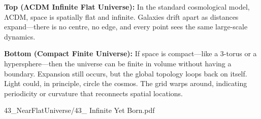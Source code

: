 \begin{SideNotePage}{
  \textbf{Top (ΛCDM Infinite Flat Universe):}  
  In the standard cosmological model, ΛCDM, space is spatially flat and infinite. Galaxies drift apart as distances expand—there is no centre, no edge, and every point sees the same large-scale dynamics.  \par

  \textbf{Bottom (Compact Finite Universe):}  
  If space is compact—like a 3-torus or a hypersphere—then the universe can be finite in volume without having a boundary. Expansion still occurs, but the global topology loops back on itself. Light could, in principle, circle the cosmos. The grid warps around, indicating periodicity or curvature that reconnects spatial locations. \par
}{43_NearFlatUniverse/43_ Infinite Yet Born.pdf}
\end{SideNotePage}
